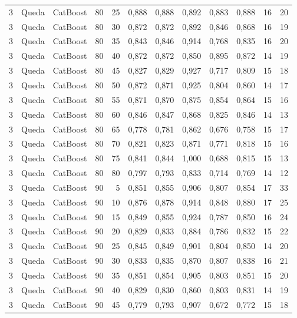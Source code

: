 \begin{longtable}{ccclrrrrrrrr}
3 & Queda & CatBoost & 80 & 25 & 0,888 & 0,888 & 0,892 & 0,883 & 0,888 & 16 & 20 \\
3 & Queda & CatBoost & 80 & 30 & 0,872 & 0,872 & 0,892 & 0,846 & 0,868 & 16 & 19 \\
3 & Queda & CatBoost & 80 & 35 & 0,843 & 0,846 & 0,914 & 0,768 & 0,835 & 16 & 20 \\
3 & Queda & CatBoost & 80 & 40 & 0,872 & 0,872 & 0,850 & 0,895 & 0,872 & 14 & 19 \\
3 & Queda & CatBoost & 80 & 45 & 0,827 & 0,829 & 0,927 & 0,717 & 0,809 & 15 & 18 \\
3 & Queda & CatBoost & 80 & 50 & 0,872 & 0,871 & 0,925 & 0,804 & 0,860 & 14 & 17 \\
3 & Queda & CatBoost & 80 & 55 & 0,871 & 0,870 & 0,875 & 0,854 & 0,864 & 15 & 16 \\
3 & Queda & CatBoost & 80 & 60 & 0,846 & 0,847 & 0,868 & 0,825 & 0,846 & 14 & 13 \\
3 & Queda & CatBoost & 80 & 65 & 0,778 & 0,781 & 0,862 & 0,676 & 0,758 & 15 & 17 \\
3 & Queda & CatBoost & 80 & 70 & 0,821 & 0,823 & 0,871 & 0,771 & 0,818 & 15 & 16 \\
3 & Queda & CatBoost & 80 & 75 & 0,841 & 0,844 & 1,000 & 0,688 & 0,815 & 15 & 13 \\
3 & Queda & CatBoost & 80 & 80 & 0,797 & 0,793 & 0,833 & 0,714 & 0,769 & 14 & 12 \\
3 & Queda & CatBoost & 90 & 5 & 0,851 & 0,855 & 0,906 & 0,807 & 0,854 & 17 & 33 \\
3 & Queda & CatBoost & 90 & 10 & 0,876 & 0,878 & 0,914 & 0,848 & 0,880 & 17 & 25 \\
3 & Queda & CatBoost & 90 & 15 & 0,849 & 0,855 & 0,924 & 0,787 & 0,850 & 16 & 24 \\
3 & Queda & CatBoost & 90 & 20 & 0,829 & 0,833 & 0,884 & 0,786 & 0,832 & 15 & 22 \\
3 & Queda & CatBoost & 90 & 25 & 0,845 & 0,849 & 0,901 & 0,804 & 0,850 & 14 & 20 \\
3 & Queda & CatBoost & 90 & 30 & 0,833 & 0,835 & 0,870 & 0,807 & 0,838 & 16 & 21 \\
3 & Queda & CatBoost & 90 & 35 & 0,851 & 0,854 & 0,905 & 0,803 & 0,851 & 15 & 20 \\
3 & Queda & CatBoost & 90 & 40 & 0,829 & 0,830 & 0,860 & 0,803 & 0,831 & 14 & 19 \\
3 & Queda & CatBoost & 90 & 45 & 0,779 & 0,793 & 0,907 & 0,672 & 0,772 & 15 & 18 \\

\end{longtable}
